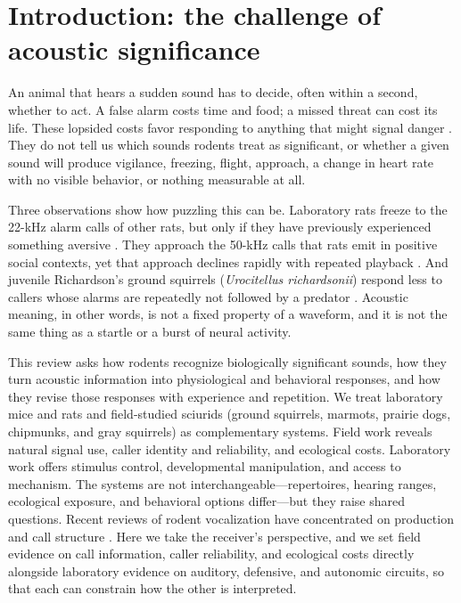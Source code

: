 \section{Introduction: the challenge of acoustic significance}
\label{sec:introduction}

An animal that hears a sudden sound has to decide, often within a second, whether to act. A false alarm costs time and food; a missed threat can cost its life. These lopsided costs favor responding to anything that might signal danger \citep{Nesse2005}. They do not tell us which sounds rodents treat as significant, or whether a given sound will produce vigilance, freezing, flight, approach, a change in heart rate with no visible behavior, or nothing measurable at all.

Three observations show how puzzling this can be. Laboratory rats freeze to the 22-kHz alarm calls of other rats, but only if they have previously experienced something aversive \citep{KimEtAl2010}. They approach the 50-kHz calls that rats emit in positive social contexts, yet that approach declines rapidly with repeated playback \citep{WilluhnEtAl2014}. And juvenile Richardson's ground squirrels (\textit{Urocitellus richardsonii}) respond less to callers whose alarms are repeatedly not followed by a predator \citep{HareAtkins2001}. Acoustic meaning, in other words, is not a fixed property of a waveform, and it is not the same thing as a startle or a burst of neural activity.

This review asks how rodents recognize biologically significant sounds, how they turn acoustic information into physiological and behavioral responses, and how they revise those responses with experience and repetition. We treat laboratory mice and rats and field-studied sciurids (ground squirrels, marmots, prairie dogs, chipmunks, and gray squirrels) as complementary systems. Field work reveals natural signal use, caller identity and reliability, and ecological costs. Laboratory work offers stimulus control, developmental manipulation, and access to mechanism. The systems are not interchangeable---repertoires, hearing ranges, ecological exposure, and behavioral options differ---but they raise shared questions. Recent reviews of rodent vocalization have concentrated on production and call structure \citep{SolajaGustison2026}. Here we take the receiver's perspective, and we set field evidence on call information, caller reliability, and ecological costs directly alongside laboratory evidence on auditory, defensive, and autonomic circuits, so that each can constrain how the other is interpreted.

